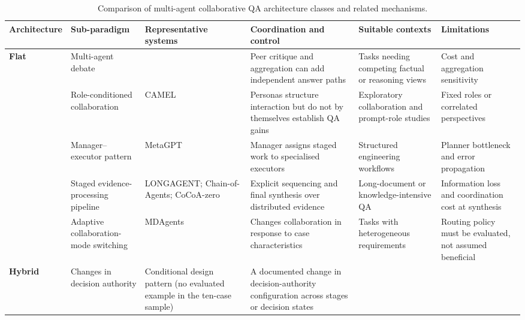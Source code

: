 \documentclass[a4paper,fleqn]{cas-dc}
\begin{document}
\begin{table}[pos=t]
  \centering
  \caption{Comparison of multi-agent collaborative QA architecture classes and related mechanisms.}
  \label{tab:9categories}
  \scriptsize
  \begin{tabular}{
    >{\raggedright\arraybackslash}p{1.5cm}
    >{\raggedright\arraybackslash}p{2.0cm}
    >{\raggedright\arraybackslash}p{2.4cm}
    >{\raggedright\arraybackslash}p{3.2cm}
    >{\raggedright\arraybackslash}p{2.3cm}
    >{\raggedright\arraybackslash}p{2.2cm}}
    \toprule
    \textbf{Architecture} & \textbf{Sub-paradigm} &
    \textbf{Representative systems} &
    \textbf{Coordination and control} &
    \textbf{Suitable contexts} & \textbf{Limitations} \\
    \midrule
    \textbf{Flat} &
    Multi-agent debate &
    \citet{du2024multiagent_debate} &
    Peer critique and aggregation can add independent answer paths &
    Tasks needing competing factual or reasoning views &
    Cost and aggregation sensitivity \\
    \midrule
    \multirow[t]{4}{*}{\textbf{Hierarchical}} &
    Role-conditioned collaboration &
    CAMEL \citep{li2023camel} &
    Personas structure interaction but do not by themselves establish QA gains &
    Exploratory collaboration and prompt-role studies &
    Fixed roles or correlated perspectives \\
     &
    Manager--executor pattern &
    MetaGPT \citep{hong2024metagpt} &
    Manager assigns staged work to specialised executors &
    Structured engineering workflows &
    Planner bottleneck and error propagation \\
     &
    Staged evidence-processing pipeline &
    LONGAGENT; Chain-of-Agents; CoCoA-zero \citep{zhao2024longagent,zhang2024chain_agents,jiang2026cocoa} &
    Explicit sequencing and final synthesis over distributed evidence &
    Long-document or knowledge-intensive QA &
    Information loss and coordination cost at synthesis \\
     &
    Adaptive collaboration-mode switching &
    MDAgents \citep{kim2024mdagents} &
    Changes collaboration in response to case characteristics &
    Tasks with heterogeneous requirements &
    Routing policy must be evaluated, not assumed beneficial \\
    \midrule
    \textbf{Hybrid} &
    Changes in decision authority &
    Conditional design pattern (no evaluated example in the ten-case sample) &
    A documented change in decision-authority configuration across stages or decision states &

\end{tabular}
\end{table}
\end{document}

